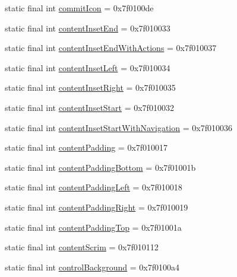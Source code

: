 \begin{CompactItemize}
\item 
static final int \hyperlink{classandroid_1_1support_1_1coreutils_1_1_r_1_1attr_28d39264d30ac4067010f1047cf65599}{commitIcon} = 0x7f0100de
\item 
static final int \hyperlink{classandroid_1_1support_1_1coreutils_1_1_r_1_1attr_f186e4401f833e4181fcbef4789a64c1}{contentInsetEnd} = 0x7f010033
\item 
static final int \hyperlink{classandroid_1_1support_1_1coreutils_1_1_r_1_1attr_8f42fafd955f39238cc61fc3fc9e3f83}{contentInsetEndWithActions} = 0x7f010037
\item 
static final int \hyperlink{classandroid_1_1support_1_1coreutils_1_1_r_1_1attr_ecdc0128c8b714fbfecea15a8b99d3b3}{contentInsetLeft} = 0x7f010034
\item 
static final int \hyperlink{classandroid_1_1support_1_1coreutils_1_1_r_1_1attr_269450ae0c06eeecb84f99aab9b5a8dc}{contentInsetRight} = 0x7f010035
\item 
static final int \hyperlink{classandroid_1_1support_1_1coreutils_1_1_r_1_1attr_7b137908877ccb0baea34419048db459}{contentInsetStart} = 0x7f010032
\item 
static final int \hyperlink{classandroid_1_1support_1_1coreutils_1_1_r_1_1attr_abc356da4626c5f9093960424a737fdc}{contentInsetStartWithNavigation} = 0x7f010036
\item 
static final int \hyperlink{classandroid_1_1support_1_1coreutils_1_1_r_1_1attr_adf9f3e8077fec93127c551f05f15a4b}{contentPadding} = 0x7f010017
\item 
static final int \hyperlink{classandroid_1_1support_1_1coreutils_1_1_r_1_1attr_243856cff973b6d0479e11a8922b2530}{contentPaddingBottom} = 0x7f01001b
\item 
static final int \hyperlink{classandroid_1_1support_1_1coreutils_1_1_r_1_1attr_01ff5499940d5915c78d91d609cb7f42}{contentPaddingLeft} = 0x7f010018
\item 
static final int \hyperlink{classandroid_1_1support_1_1coreutils_1_1_r_1_1attr_6d2f18478b60aa089d42b6330b4e8dfd}{contentPaddingRight} = 0x7f010019
\item 
static final int \hyperlink{classandroid_1_1support_1_1coreutils_1_1_r_1_1attr_f3004de7bb3a1f37b8eeae49b6368999}{contentPaddingTop} = 0x7f01001a
\item 
static final int \hyperlink{classandroid_1_1support_1_1coreutils_1_1_r_1_1attr_91d0e6a0f2b97c63c4ca4f09a0b2f6dc}{contentScrim} = 0x7f010112
\item 
static final int \hyperlink{classandroid_1_1support_1_1coreutils_1_1_r_1_1attr_69e1ebcd1825d62cf5190d293d95f367}{controlBackground} = 0x7f0100a4

\end{CompactItemize}

